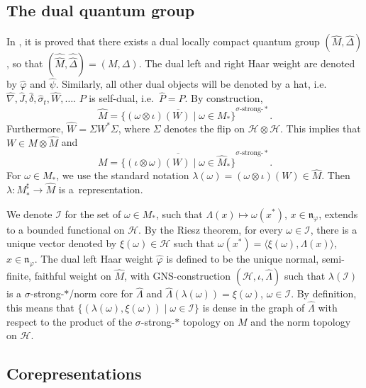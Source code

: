 \documentclass[pdftex]{sigma}
\numberwithin{equation}{section}
\theoremstyle{definition}
\newcommand{\cHil}{\mathcal{H}}
\newcommand{\nphi}{\mathfrak{n}_\varphi}
\begin{document}
\subsection*{The dual quantum group}
In \cite{KusVae, KusVaeII}, it is
proved that there exists a dual locally compact quantum group
$(\hat{M},\hat{\Delta})$, so that
$(\hat{\hat{M}},\hat{\hat{\Delta}}) = (M,\Delta)$. The dual left
and right Haar weight are denoted by $\hat{\varphi}$ and
$\hat{\psi}$. Similarly, all other dual objects will be denoted by
a hat, i.e.\ $\hat{\nabla}, \hat{J}, \hat{\delta}, \hat{\sigma}_t, \hat{W}, \ldots$.  $P$ is self-dual, i.e.\ $\hat{P} = P$. By construction,
\[\hat{M} = \overline{\big\{ (\omega
\otimes \iota)(W) \mid \omega \in M_\ast
\big\}}^{\sigma\text{-strong-}\ast}.
\] Furthermore, $\hat{W} =
\Sigma W^\ast \Sigma$, where $\Sigma$ denotes the f\/lip on $\cHil
\otimes \cHil$. This implies that $W \in M \otimes \hat{M}$ and
\[
M = \overline{\big\{ (\iota \otimes \omega)(W) \mid \omega \in
\hat{M}_\ast \big\}}^{\sigma\text{-strong-}\ast}.
\]
 For $\omega \in
M_\ast$, we use the standard notation $\lambda(\omega) = (\omega
\otimes \iota) (W) \in \hat{M}$. Then $\lambda: M_\ast^\sharp \rightarrow \hat{M}$ is a~representation.

 We denote $\mathcal{I}$ for the set of
$\omega \in M_\ast$, such that $\Lambda(x) \mapsto \omega(x^\ast)$,
$x \in \nphi$, extends to a bounded functional on $\cHil$. By the
Riesz theorem, for every $\omega \in \mathcal{I}$, there is a
unique vector denoted by $\xi(\omega) \in \cHil$ such that
$\omega(x^\ast) = \langle \xi(\omega)  , \Lambda(x) \rangle$, $x \in
\nphi$. The dual left Haar weight $\hat{\varphi}$ is def\/ined to be
the unique normal, semi-f\/inite, faithful weight on $\hat{M}$, with
GNS-construction $(\cHil, \iota, \hat{\Lambda})$ such that
$\lambda(\mathcal{I})$ is a $\sigma$-strong-$\ast$/norm core for
$\hat{\Lambda}$ and $\hat{\Lambda}(\lambda(\omega)) = \xi(\omega)$,
$\omega \in \mathcal{I}$. By def\/inition, this means that $\{ (\lambda(\omega), \xi(\omega)) \mid \omega \in \mathcal{I} \}$ is dense in the graph of $\hat{\Lambda}$ with respect to the product of the $\sigma$-strong-$\ast$ topology on $M$ and the norm topology on $\cHil$.

\subsection*{Corepresentations}
\end{document}
